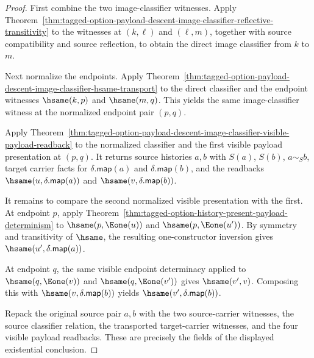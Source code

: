 \begin{proof}
First combine the two image-classifier witnesses. Apply
Theorem~\ref{thm:tagged-option-payload-descent-image-classifier-reflective-transitivity}
to the witnesses at $(k,\ell)$ and $(\ell,m)$, together with source
compatibility and source reflection, to obtain the direct image classifier from
$k$ to $m$.

Next normalize the endpoints. Apply
Theorem~\ref{thm:tagged-option-payload-descent-image-classifier-hsame-transport}
to the direct classifier and the endpoint witnesses $\hsame(k,p)$ and
$\hsame(m,q)$. This yields the same image-classifier witness at the normalized
endpoint pair $(p,q)$.

Apply
Theorem~\ref{thm:tagged-option-payload-descent-image-classifier-visible-payload-readback}
to the normalized classifier and the first visible payload presentation at
$(p,q)$. It returns source histories $a,b$ with $S(a)$, $S(b)$, $a\sim_S b$,
target carrier facts for $\delta.\mathsf{map}(a)$ and $\delta.\mathsf{map}(b)$,
and the readbacks $\hsame(u,\delta.\mathsf{map}(a))$ and
$\hsame(v,\delta.\mathsf{map}(b))$.

It remains to compare the second normalized visible presentation with the first.
At endpoint $p$, apply
Theorem~\ref{thm:tagged-option-history-present-payload-determinism} to
$\hsame(p,\Eone(u))$ and $\hsame(p,\Eone(u'))$. By symmetry and transitivity of
$\hsame$, the resulting one-constructor inversion gives
$\hsame(u',\delta.\mathsf{map}(a))$.

At endpoint $q$, the same visible endpoint determinacy applied to
$\hsame(q,\Eone(v))$ and $\hsame(q,\Eone(v'))$ gives
$\hsame(v',v)$. Composing this with $\hsame(v,\delta.\mathsf{map}(b))$ yields
$\hsame(v',\delta.\mathsf{map}(b))$.

Repack the original source pair $a,b$ with the two source-carrier witnesses, the
source classifier relation, the transported target-carrier witnesses, and the
four visible payload readbacks. These are precisely the fields of the displayed
existential conclusion.
\end{proof}

